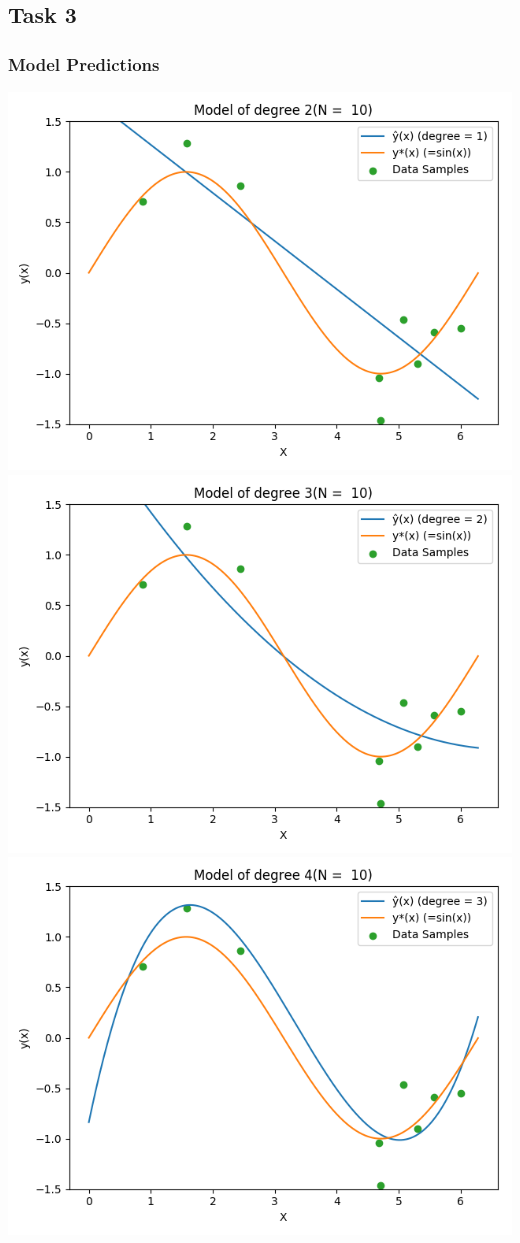 \documentclass{article}
\begin{document}
\subsection{Task 3}
\subsubsection{Model Predictions}
\includegraphics[width=\linewidth]{2.png}
\includegraphics[width=\linewidth]{3.png}
\includegraphics[width=\linewidth]{4.png}
\end{document}
